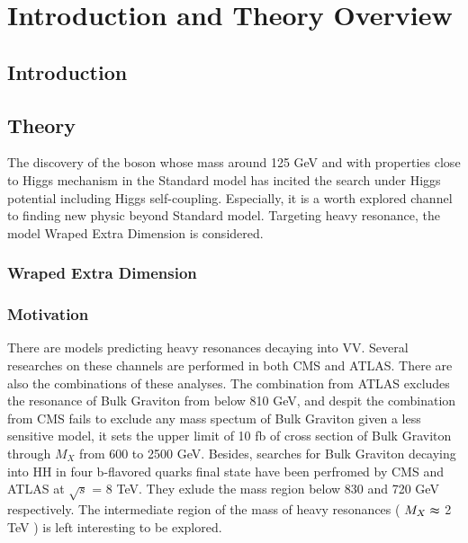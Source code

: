 \chapter{Introduction and Theory Overview} \label{Introduction and Theory Overview}

\section{Introduction}

\section{Theory}

The discovery of the boson whose mass around 125 GeV and with properties close to Higgs mechanism in the Standard model has incited the search under Higgs potential including Higgs self-coupling. Especially, it is a worth explored channel to finding new physic beyond Standard model. 
Targeting heavy resonance, the model Wraped Extra Dimension is considered. 

\subsection{Wraped Extra Dimension} 

\subsection{Motivation} 
There are models predicting heavy resonances decaying into VV.
Several researches on these channels are performed in both CMS and ATLAS.
There are also the combinations of these analyses.
The combination from ATLAS excludes the resonance of Bulk Graviton from below 810 GeV, and despit the combination from CMS fails to exclude any mass spectum of Bulk Graviton given a less sensitive model, it sets the upper limit of 10 fb of cross section of Bulk Graviton through $M_X$ from 600 to 2500 GeV.
Besides, searches for Bulk Graviton decaying into HH in four b-flavored quarks final state have been perfromed by CMS and ATLAS at $\sqrt{s}$ = 8 TeV. They exlude the mass region below 830 and 720 GeV respectively. The intermediate region of the mass of heavy resonances ( $M_X \thickapprox$ 2 TeV ) is left interesting to be explored.
 



